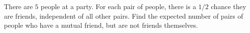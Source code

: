 There are $5$ people at a party. For each pair of people, there is a $1 / 2$ chance they are friends, independent of all other pairs. Find the expected number of pairs of people who have a mutual friend, but are not friends themselves.